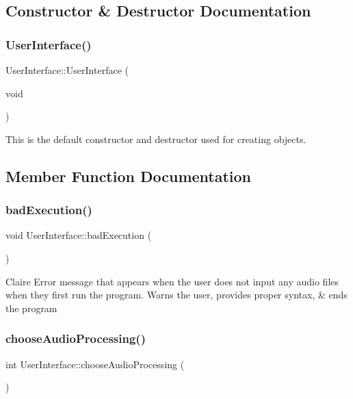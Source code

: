 \subsection{Constructor \& Destructor Documentation}
\mbox{\label{classUserInterface_a8b13ec79c20afd56c61280fe63fec837}} 
\subsubsection{\texorpdfstring{User\+Interface()}{UserInterface()}}
{\footnotesize\ttfamily User\+Interface\+::\+User\+Interface (\begin{DoxyParamCaption}\item[{void}]{ }\end{DoxyParamCaption})}

This is the default constructor and destructor used for creating objects. 

\subsection{Member Function Documentation}
\mbox{\label{classUserInterface_a17bacd55dbd5519b84be8c0c1b996e1c}} 
\subsubsection{\texorpdfstring{bad\+Execution()}{badExecution()}}
{\footnotesize\ttfamily void User\+Interface\+::bad\+Execution (\begin{DoxyParamCaption}{ }\end{DoxyParamCaption})}

Claire Error message that appears when the user does not input any audio files when they first run the program. Warns the user, provides proper syntax, \& ends the program \mbox{\label{classUserInterface_a370e52a3e34615a3b5e350d6f83e2011}} 
\subsubsection{\texorpdfstring{choose\+Audio\+Processing()}{chooseAudioProcessing()}}
{\footnotesize\ttfamily int User\+Interface\+::choose\+Audio\+Processing (\begin{DoxyParamCaption}{ }\end{DoxyParamCaption})}

